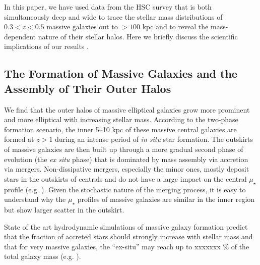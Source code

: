 \documentclass[a4paper,fleqn,usenatbib]{mnras}
\def\mden{{$\mu_{\star}$}}
\begin{document}
    In this paper, we have used  data from the HSC survey that is both simultaneously deep and wide to trace the stellar mass distributions of 
    $0.3 < z < 0.5$ massive galaxies out to $>100$ kpc and to reveal the mass-dependent nature 
    of their stellar halos.
    Here we briefly discuss the scientific implications of our results .
    

\subsection{The Formation of Massive Galaxies and the Assembly of Their Outer Halos}
    \label{ssec:twophase}
            
    We find that the outer halos of massive elliptical galaxies grow more prominent and 
    more elliptical with increasing stellar mass.
    According to the two-phase formation scenario, the inner 5--10 kpc of these 
    massive central galaxies are formed at $z>1$ during an intense period of 
    \textit{in situ} star formation. 
    The outskirts of massive galaxies are then built up through a more gradual second 
    phase of evolution (the \textit{ex situ} phase) that is dominated by mass assembly via 
    accretion via mergers.
    Non-dissipative mergers, especially the minor ones, mostly deposit stars in the 
    outskirts of centrals and do not have a large impact on the central \mden{} 
    profile (e.g. \citealt{BoylanKolchin2008, Oogi2013, Bedorf2013}).
    Given the stochastic nature of the merging process, it is easy to understand why 
    the \mden{} profiles of massive galaxies are similar in the inner region but show
    larger scatter in the outskirt. 
        
    State of the art hydrodynamic simulations of massive galaxy formation predict 
    that the fraction of accreted stars should strongly increase with stellar 
    mass and that for very massive galaxies, the  ``ex-situ'' may reach up to xxxxxxx \% of the total galaxy mass (e.g.
    \citealt{Oser2010, Cooper2013, Dubois2013, LeeYi2013, Hirschmann2015,
    RodriguezGomez2016}). 
    
\end{document}
